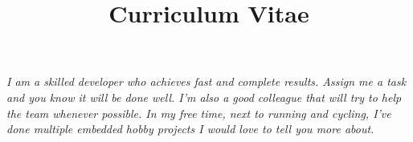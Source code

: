 \documentclass[11pt,a4paper,sans]{moderncv} %
\title{\huge{Curriculum Vitae}}
\begin{document}




\makecvtitle %


\vspace{-15pt}
\begin{adjustwidth}{50pt}{50pt}
    \textit{I am a skilled developer who achieves fast and complete results.
    Assign me a task and you know it will be done well.
    I'm also a good colleague that will try to help the team whenever possible.
    In my free time, next to running and cycling, I've done multiple embedded hobby projects I would love to tell you more about.}
\end{adjustwidth}
\vspace{10pt}

\end{document}

